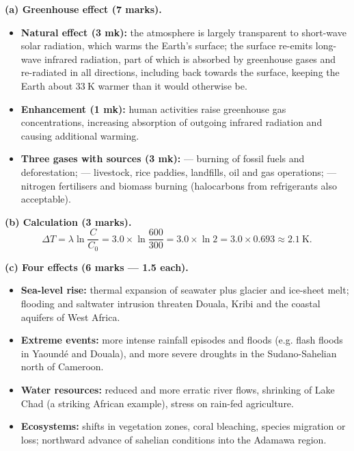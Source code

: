 \documentclass[11pt]{article}
\begin{document}
\begin{corrige}
\textbf{(a) Greenhouse effect (7 marks).}
\begin{itemize}
\item \textbf{Natural effect (3 mk):} the atmosphere is largely transparent to short-wave solar radiation, which warms the Earth's surface; the surface re-emits long-wave infrared radiation, part of which is absorbed by greenhouse gases and re-radiated in all directions, including back towards the surface, keeping the Earth about $33\ \mathrm{K}$ warmer than it would otherwise be.
\item \textbf{Enhancement (1 mk):} human activities raise greenhouse gas concentrations, increasing absorption of outgoing infrared radiation and causing additional warming.
\item \textbf{Three gases with sources (3 mk):}  — burning of fossil fuels and deforestation;  — livestock, rice paddies, landfills, oil and gas operations;  — nitrogen fertilisers and biomass burning (halocarbons from refrigerants also acceptable).
\end{itemize}

\textbf{(b) Calculation (3 marks).}
\[ \Delta T = \lambda \ln\frac{C}{C_0} = 3.0 \times \ln\frac{600}{300} = 3.0 \times \ln 2 = 3.0 \times 0.693 \approx \SI{2.1}{\kelvin}. \]

\textbf{(c) Four effects (6 marks — 1.5 each).}
\begin{itemize}
\item \textbf{Sea-level rise:} thermal expansion of seawater plus glacier and ice-sheet melt; flooding and saltwater intrusion threaten Douala, Kribi and the coastal aquifers of West Africa.
\item \textbf{Extreme events:} more intense rainfall episodes and floods (e.g. flash floods in Yaoundé and Douala), and more severe droughts in the Sudano-Sahelian north of Cameroon.
\item \textbf{Water resources:} reduced and more erratic river flows, shrinking of Lake Chad (a striking African example), stress on rain-fed agriculture.
\item \textbf{Ecosystems:} shifts in vegetation zones, coral bleaching, species migration or loss; northward advance of sahelian conditions into the Adamawa region.
\end{itemize}


\end{corrige}
\end{document}
